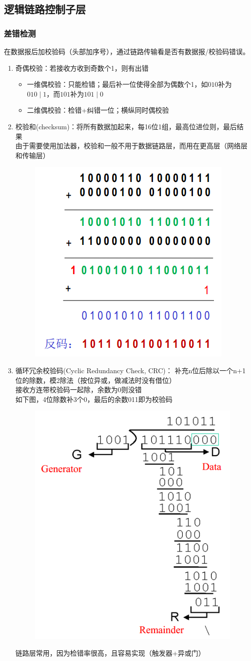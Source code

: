 \subsection{逻辑链路控制子层}
\subsubsection{差错检测}
在数据报后加校验码（头部加序号），通过链路传输看是否有数据报/校验码错误。
\begin{enumerate}
\item 奇偶校验：若接收方收到奇数个1，则有出错
\begin{itemize}
	\item 一维偶校验：只能检错；最后补一位使得全部为偶数个1，如$010$补为$010\mid 1$，而$101$补为$101\mid 0$
	\item 二维偶校验：检错+纠错一位；横纵同时偶校验
\end{itemize}
\item 校验和(checksum)：将所有数据加起来，每16位1组，最高位进位则，最后结果\\
由于需要使用加法器，校验和一般不用于数据链路层，而用在更高层（网络层和传输层）
\begin{figure}[H]
	\centering
	\includegraphics[width=0.3\linewidth]{fig/checksum.PNG}
\end{figure}
\item 循环冗余校验码(Cyclic Redundancy Check, CRC)：
补充n位后除以一个n+1位的除数，模2除法（按位异或，做减法时没有借位）\\
接收方连带校验码一起除，余数为0则没错\\
如下图，4位除数补3个0，最后的余数011即为校验码
\begin{figure}[H]
	\centering
	\includegraphics[width=0.3\linewidth]{fig/CRC.PNG}
\end{figure}
链路层常用，因为检错率很高，且容易实现（触发器+异或门）
\end{enumerate}

